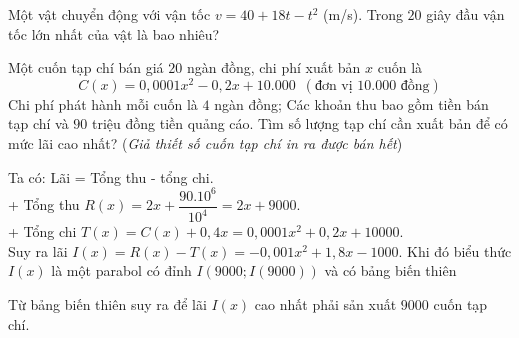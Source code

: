 \begin{vd}%
	Một vật chuyển động với vận tốc $v=40+18t-t^2$ (m/s). Trong $20$ giây đầu vận tốc lớn nhất của vật là bao nhiêu?

\end{vd}

\begin{vd}%
	Một cuốn tạp chí bán giá $20$ ngàn đồng, chi phí xuất bản $x$ cuốn là
	\[ C(x)=0,0001x^2-0,2x+10.000 \,\, \, (\text{đơn vị 10.000 đồng})\]
	Chi phí phát hành mỗi cuốn là $4$ ngàn đồng; Các khoản thu bao gồm tiền bán tạp chí và $90$ triệu đồng tiền quảng cáo. Tìm số lượng tạp chí cần xuất bản để có mức lãi cao nhất? (\textit{Giả thiết số cuốn tạp chí in ra được bán hết})
	\loigiai
	{
		Ta có: Lãi = Tổng thu - tổng chi.\\
		+ Tổng thu $R(x) = 2x+\dfrac{90.10^6}{10^4}=2x+9000$.\\
		+ Tổng chi $T(x) = C(x)+0,4x =0,0001x^2+0,2x+10000$.\\
		Suy ra lãi $I(x) = R(x)-T(x)=-0,001x^2+1,8x-1000$. Khi đó biểu thức $I(x)$ là một parabol có đỉnh $I(9000;I(9000))$ và có bảng biến thiên
		\begin{center}
		\end{center}
		Từ bảng biến thiên suy ra để lãi $I(x)$ cao nhất phải sản xuất $9000$ cuốn tạp chí.
	}
\end{vd}

